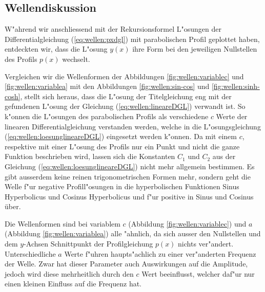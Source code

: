 \subsection{Wellendiskussion}
\label{sec:wellen:diskussionwellenform}
W"ahrend wir anschliessend mit der Rekursionsformel L"osungen der 
Differentialgleichung (\ref{eq:wellen:pxdgl}) mit parabolischen Profil
geplottet haben, entdeckten wir, dass die L"osung $y(x)$ ihre Form 
bei den jeweiligen Nullstellen des Profils $p(x)$ wechselt.

Vergleichen wir die Wellenformen der Abbildungen \ref{fig:wellen:variablec} und 
\ref{fig:wellen:variablea} mit den Abbildungen \ref{fig:wellen:sin-cos} und 
\ref{fig:wellen:sinh-cosh}, stellt sich heraus, dass die L"osung der 
Titelgleichung eng mit der gefundenen L"osung der Gleichung 
(\ref{eq:wellen:lineareDGL}) verwandt ist. So k"onnen die L"osungen des 
parabolischen Profils als verschiedene $c$ Werte der linearen 
Differentialgleichung verstanden werden, welche in die L"osungsgleichung 
(\ref{eq:wellen:loesunglineareDGL}) eingesetzt werden k"onnen. 
Da mit einem $c$, respektive mit einer L"osung des Profils nur ein Punkt 
und nicht die ganze Funktion beschrieben wird, lassen sich die Konstanten $C_1$ 
und $C_2$ aus der Gleichung (\ref{eq:wellen:loesunglineareDGL}) nicht mehr 
allgemein bestimmen. Es gibt ausserdem keine reinen trigonometrischen Formen 
mehr, sondern geht die Welle f"ur negative Profill"osungen in die 
hyperbolischen Funktionen Sinus Hyperbolicus und Cosinus Hyperbolicus und f"ur 
positive in Sinus und Cosinus über.

Die Wellenformen sind bei variablem $c$ (Abbildung \ref{fig:wellen:variablec}) 
und $a$ (Abbildung \ref{fig:wellen:variablea}) alle "ahnlich, da sich ausser 
den Nullstellen und dem $y$-Achsen Schnittpunkt der Profilgleichung $p(x)$ 
nichts ver"andert. Unterschiedliche $a$ Werte f"uhren haupts"achlich zu einer 
ver"anderten Frequenz der Welle. Zwar hat dieser Parameter auch Auswirkungen 
auf die Amplitude, jedoch wird diese mehrheitlich durch den $c$ Wert 
beeinflusst, welcher daf"ur nur einen kleinen Einfluss auf die Frequenz hat.

